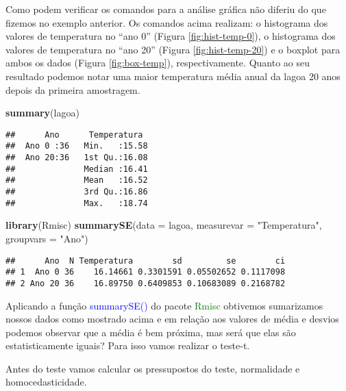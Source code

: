 \documentclass[titlepage, oneside, openany, a4paper]{book}
\newenvironment{Shaded}{\begin{snugshade}}{\end{snugshade}}
\newcommand{\DataTypeTok}[1]{\textcolor[rgb]{0.13,0.29,0.53}{#1}}
\newcommand{\KeywordTok}[1]{\textcolor[rgb]{0.13,0.29,0.53}{\textbf{#1}}}
\newcommand{\NormalTok}[1]{#1}
\newcommand{\OperatorTok}[1]{\textcolor[rgb]{0.81,0.36,0.00}{\textbf{#1}}}
\newcommand{\StringTok}[1]{\textcolor[rgb]{0.31,0.60,0.02}{#1}}
\begin{document}
Como podem verificar os comandos para a análise gráfica não diferiu do que fizemos no exemplo anterior. Os comandos acima realizam: o histograma dos valores de temperatura no ``ano 0'' (Figura \ref{fig:hist-temp-0}), o histograma dos valores de temperatura no ``ano 20'' (Figura \ref{fig:hist-temp-20}) e o boxplot para ambos os dados (Figura \ref{fig:box-temp}), respectivamente. Quanto ao seu resultado podemos notar uma maior temperatura média anual da lagoa 20 anos depois da primeira amostragem.

\begin{Shaded}
\begin{Highlighting}[]
\KeywordTok{summary}\NormalTok{(lagoa)}
\end{Highlighting}
\end{Shaded}

\begin{verbatim}
##      Ano      Temperatura   
##  Ano 0 :36   Min.   :15.58  
##  Ano 20:36   1st Qu.:16.08  
##              Median :16.41  
##              Mean   :16.52  
##              3rd Qu.:16.86  
##              Max.   :18.74
\end{verbatim}

\begin{Shaded}
\begin{Highlighting}[]
\KeywordTok{library}\NormalTok{(Rmisc)}
\KeywordTok{summarySE}\NormalTok{(}\DataTypeTok{data =}\NormalTok{ lagoa, }\DataTypeTok{measurevar =} \StringTok{"Temperatura"}\NormalTok{, }\DataTypeTok{groupvars =} \StringTok{"Ano"}\NormalTok{)}
\end{Highlighting}
\end{Shaded}

\begin{verbatim}
##      Ano  N Temperatura        sd         se        ci
## 1  Ano 0 36    16.14661 0.3301591 0.05502652 0.1117098
## 2 Ano 20 36    16.89750 0.6409853 0.10683089 0.2168782
\end{verbatim}

Aplicando a função \textcolor{blue}{summarySE()} do pacote \textcolor{green}{Rmisc} obtivemos sumarizamos nossos dados como mostrado acima e em relação aos valores de média e desvios podemos observar que a média é bem próxima, mas será que elas são estatisticamente iguais? Para isso vamos realizar o teste-t.

Antes do teste vamos calcular os pressupostos do teste, normalidade e homocedasticidade.

\begin{Shaded}
\end{Shaded}
\end{document}
